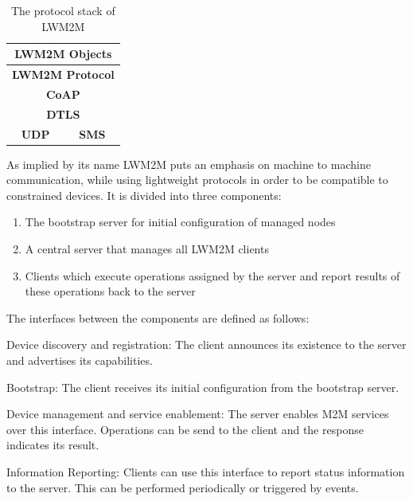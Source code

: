 \documentclass[conference]{IEEEtran}
\begin{document}
\begin{table}[h]
\begin{center}
  \begin{tabular}{|c|c|}
  \hline
  \multicolumn{2}{|c|}{\textbf{LWM2M Objects}}  \\ \hline
  \multicolumn{2}{|c|}{\textbf{LWM2M Protocol}} \\ \hline
  \multicolumn{2}{|c|}{\textbf{CoAP}}           \\ \hline
  \multicolumn{2}{|c|}{\textbf{DTLS}}           \\ \hline
  \textbf{UDP}           & \textbf{SMS}         \\ \hline
  \end{tabular}
\end{center}

\caption{The protocol stack of LWM2M}
\label{fig:lwm2m-stack}
\end{table}


As implied by its name LWM2M puts an emphasis on machine to machine communication, while using lightweight protocols in order to be compatible to constrained devices. It is divided into three components:

\begin{enumerate}
  \item The bootstrap server for initial configuration of managed nodes
  \item A central server that manages all LWM2M clients
  \item Clients which execute operations assigned by the server and report results of these operations back to the server
\end{enumerate}

The interfaces between the components are defined as follows:

\begin{LaTeXdescription}
  \item [Device discovery and registration:] The client announces its existence to the server and advertises its capabilities.
  \item [Bootstrap:] The client receives its initial configuration from the bootstrap server. 
  \item [Device management and service enablement:] The server enables M2M services over this interface. Operations can be send to the client and the response indicates its result.
  \item [Information Reporting:] Clients can use this interface to report status information to the server. This can be performed periodically or triggered by events.
\end{LaTeXdescription}
\end{document}
